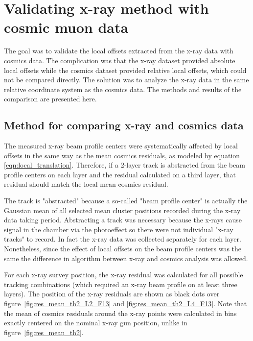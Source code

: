 
\chapter{Validating x-ray method with cosmic muon data}
\label{chap:comparison}

The goal was to validate the local offsets extracted from the x-ray data with cosmics data. The complication was that the x-ray dataset provided absolute local offsets while the cosmics dataset provided relative local offsets, which could not be compared directly. The solution was to analyze the x-ray data in the same relative coordinate system as the cosmics data. The methods and results of the comparison are presented here.

\section{Method for comparing x-ray and cosmics data}

The measured x-ray beam profile centers were systematically affected by local offsets in the same way as the mean cosmics residuals, as modeled by equation \ref{eqn:local_translation}. Therefore, if a 2-layer track is abstracted from the beam profile centers on each layer and the residual calculated on a third layer, that residual should match the local mean cosmics residual. 

The track is "abstracted" because a so-called "beam profile center" is actually the Gaussian mean of all selected mean cluster positions recorded during the x-ray data taking period. Abstracting a track was necessary because the x-rays cause signal in the chamber via the photoeffect so there were not individual "x-ray tracks" to record. In fact the x-ray data was collected separately for each layer. Nonetheless, since the effect of local offsets on the beam profile centers was the same the difference in algorithm between x-ray and cosmics analysis was allowed. 

For each x-ray survey position, the x-ray residual was calculated for all possible tracking combinations (which required an x-ray beam profile on at least three layers). The position of the x-ray residuals are shown as black dots over figure~\ref{fig:res_mean_th2_L2_F13} and \ref{fig:res_mean_th2_L4_F13}. Note that the mean of cosmics residuals around the x-ray points were calculated in bins exactly centered on the nominal x-ray gun position, unlike in figure~\ref{fig:res_mean_th2}.

